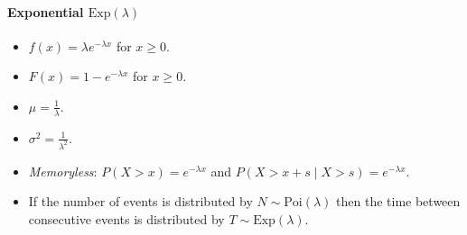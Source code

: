 \documentclass[twocolumn,english]{article}
\begin{document}
\paragraph{Exponential $\text{Exp}\left(\lambda\right)$}
\begin{itemize}
\item $f\left(x\right)=\lambda e^{-\lambda x}$ for $x\geq0$.
\item $F\left(x\right)=1-e^{-\lambda x}$ for $x\geq0$.
\item $\mu=\frac{1}{\lambda}$.
\item $\sigma^{2}=\frac{1}{\lambda^{2}}$.
\item \emph{Memoryless}: $P\left(X>x\right)=e^{-\lambda x}$ and $P\left(X>x+s\mid X>s\right)=e^{-\lambda x}$.
\item If the number of events is distributed by $N\sim\text{Poi}\left(\lambda\right)$
then the time between consecutive events is distributed by $T\sim\text{Exp}\left(\lambda\right)$.
\end{itemize}
\end{document}
